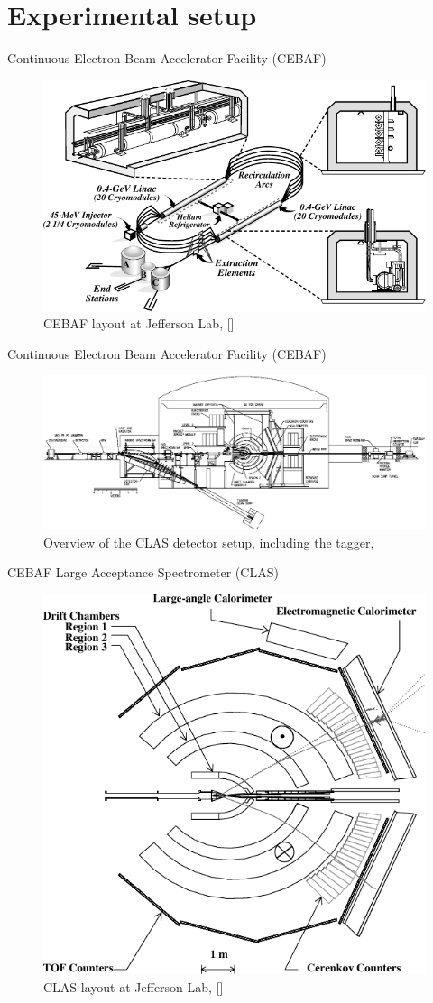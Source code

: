 \documentclass[11pt,aspectratio=1610,dvipsnames]{beamer}
\begin{document}
\section{Experimental setup}
\begin{frame}{Continuous Electron Beam Accelerator Facility (CEBAF)}
	\begin{figure}
		\centering
		\includegraphics[width=.8\linewidth]{cebaf}
		\caption*{CEBAF layout at Jefferson Lab, [\cite{clas}]}
	\end{figure}
\end{frame}


\begin{frame}{Continuous Electron Beam Accelerator Facility (CEBAF)}
	\begin{figure}
			\centering
			\includegraphics[width=\linewidth]{figs/tagger.png}
			\caption{Overview of the CLAS detector setup, including the tagger, \citet{clas}}
	\end{figure}
\end{frame}


\begin{frame}{CEBAF Large Acceptance Spectrometer (CLAS)}
	\begin{figure}
		\centering
		\includegraphics[width=.5\linewidth]{clas}
		\caption*{CLAS layout at Jefferson Lab, [\cite{clas}]}
	\end{figure}
\end{frame}
\end{document}
